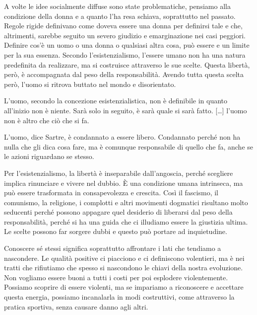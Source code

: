 \documentclass[12pt]{book} %
\begin{document}
A volte le idee socialmente diffuse sono state problematiche, pensiamo alla condizione della donna e a quanto l'ha resa schiava, soprattutto nel passato. Regole rigide definivano come doveva essere una donna per definirsi tale e che, altrimenti, sarebbe seguito un severo giudizio e emarginazione nei casi peggiori. Definire cos'è un uomo o una donna o qualsiasi altra cosa, può essere e un limite per la sua essenza. Secondo l’esistenzialismo, l’essere umano non ha una natura predefinita da realizzare, ma si costruisce attraverso le sue scelte. Questa libertà, però, è accompagnata dal peso della responsabilità. Avendo tutta questa scelta però, l'uomo si ritrova buttato nel mondo e disorientato.

L'uomo, secondo la concezione esistenzialistica, non è definibile in quanto all'inizio non è niente. Sarà solo in seguito, è sarà quale si sarà fatto. […] l'uomo non è altro che ciò che si fa.

L'uomo, dice Sartre, è condannato a essere libero. Condannato perché non ha nulla che gli dica cosa fare, ma è comunque
responsabile di quello che fa, anche se le azioni riguardano se stesso.

Per l’esistenzialismo, la libertà è inseparabile dall’angoscia, perché scegliere implica rinunciare e vivere nel dubbio. È una condizione umana intrinseca, ma può essere trasformata in consapevolezza e crescita. Così il fascismo, il comunismo, la religione, i complotti e altri movimenti dogmatici risultano molto seducenti perché possono appagare quel desiderio di liberarsi dal peso della responsabilità, perché si ha una guida che ci illudiamo essere la giustizia ultima. Le scelte possono far sorgere dubbi e questo può portare ad inquietudine. 

Conoscere sé stessi significa soprattutto affrontare i lati che tendiamo a nascondere. Le qualità positive ci piacciono e ci definiscono volentieri, ma è nei tratti che rifiutiamo che spesso si nascondono le chiavi della nostra evoluzione.
Non vogliamo essere buoni a tutti i costi per poi esplodere violentemente.
Possiamo scoprire di essere violenti, ma se impariamo a riconoscere e accettare questa energia, possiamo incanalarla in modi costruttivi, come attraverso la pratica sportiva, senza causare danno agli altri.
\end{document}
